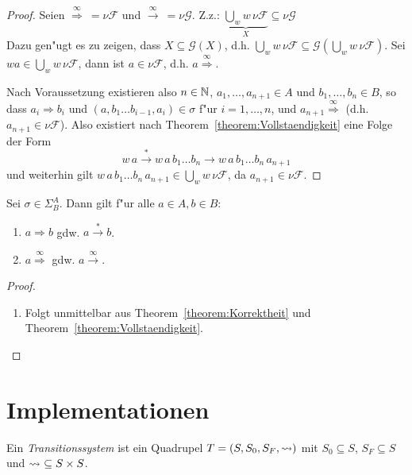 \documentclass[12pt,a4paper]{article}
\begin{document}
\begin{proof}
  Seien $\stackrel{\infty}{\Rightarrow}\ = \nu\mathcal{F}$
  und $\stackrel{\infty}{\rightarrow}\ = \nu\mathcal{G}$. Z.z.:
  $\underbrace{\bigcup_w w\,\nu\mathcal{F}}_X \subseteq \nu\mathcal{G}$ \\
  Dazu gen"ugt es zu zeigen, dass $X \subseteq \mathcal{G}(X)$, d.h.
  $\bigcup_w w\,\nu\mathcal{F} \subseteq \mathcal{G}(\bigcup_w w\,\nu\mathcal{F})$.
  Sei $wa \in \bigcup_w w\,\nu\mathcal{F}$, dann ist $a \in \nu\mathcal{F}$, d.h. $a \stackrel{\infty}{\Rightarrow}$.

  Nach Voraussetzung existieren also $n \in \mathbb N$, $a_1,\ldots,a_{n+1} \in A$ und
  $b_1,\ldots,b_n \in B$, so dass $a_i \Rightarrow b_i$ und $(a,b_1 \ldots b_{i-1},a_i) \in \sigma$
  f"ur $i=1,\ldots,n$, und $a_{n+1} \stackrel{\infty}{\Rightarrow}$ (d.h. $a_{n+1} \in \nu\mathcal{F}$).
  Also existiert nach Theorem~\ref{theorem:Vollstaendigkeit} eine Folge der Form
  \[
  w\,a \stackrel{*}{\rightarrow} w\,a\,b_1 \ldots b_n \rightarrow w\,a\,b_1 \ldots b_n\,a_{n+1}
  \]
  und weiterhin gilt $w\,a\,b_1 \ldots b_n\,a_{n+1} \in \bigcup_w w\,\nu\mathcal{F}$,
  da $a_{n+1} \in \nu\mathcal{F}$.
\end{proof}

\begin{theorem}["Aquivalenz]
  Sei $\sigma \in \Sigma^A_B$. Dann gilt f"ur alle $a \in A, b \in B$:
  \begin{enumerate}
  \item $a \Rightarrow b$ gdw. $a \stackrel{*}{\to} b$.
  \item $a \stackrel{\infty}{\Rightarrow}$ gdw. $a \stackrel{\infty}{\to}$.
  \end{enumerate}
\end{theorem}

\begin{proof} \
  \begin{enumerate}
  \item Folgt unmittelbar aus Theorem~\ref{theorem:Korrektheit} und Theorem~\ref{theorem:Vollstaendigkeit}.
  \end{enumerate}
\end{proof}


\section{Implementationen}

\begin{definition}[Transitionssystem]
  Ein \emph{Transitionssystem} ist ein Quadrupel $T = (S, S_0, S_F, \rightsquigarrow)$ mit $S_0 \subseteq S$,
  $S_F \subseteq S$ und $\rightsquigarrow\ \subseteq S \times S$.
\end{definition}
\end{document}
